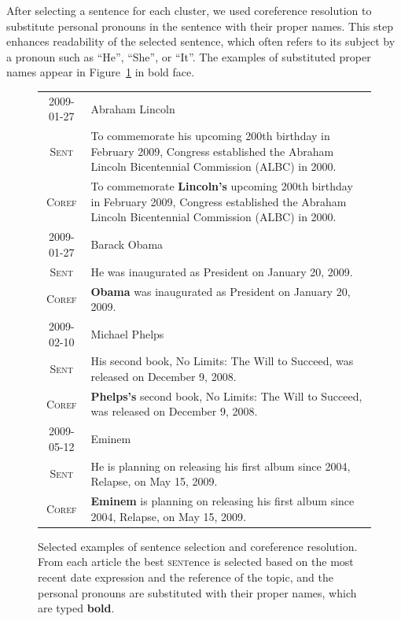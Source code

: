 \documentclass[11pt]{article}
\newcommand{\war}[1]{{\sf\small #1}}
\begin{document}
After selecting a sentence for each cluster, we used coreference resolution to substitute personal pronouns in the sentence with their proper names.
This step enhances readability of the selected sentence, which often refers to its subject by a pronoun such as ``He'', ``She'', or ``It''.
The examples of substituted proper names appear in Figure~\ref{fig:sentence-selection} in bold face.

\begin{figure}
\begin{tabularx}{\linewidth}{cX}
2009-01-27 & \war{Abraham Lincoln} \\
\textsc{Sent} & \small To commemorate his upcoming 200th birthday in February 2009, Congress established the Abraham Lincoln Bicentennial Commission (ALBC) in 2000. \\
\textsc{Coref} & \small To commemorate \textbf{Lincoln's} upcoming 200th birthday in February 2009, Congress established the Abraham Lincoln Bicentennial Commission (ALBC) in 2000. \\
\hline
2009-01-27 & \war{Barack Obama} \\
\textsc{Sent} & \small He was inaugurated as President on January 20, 2009.\\
\textsc{Coref} & \small \textbf{Obama} was inaugurated as President on January 20, 2009.\\
\hline
2009-02-10 & \war{Michael Phelps} \\
\textsc{Sent} & \small His second book, No Limits: The Will to Succeed, was released on December 9, 2008.\\
\textsc{Coref} & \small \textbf{Phelps's} second book, No Limits: The Will to Succeed, was released on December 9, 2008.\\
\hline
2009-05-12 & \war{Eminem}\\
\textsc{Sent} & \small He is planning on releasing his first album since 2004, Relapse, on May 15, 2009.\\
\textsc{Coref} & \small \textbf{Eminem} is planning on releasing his first album since 2004, Relapse, on May 15, 2009.\\
\end{tabularx}
\label{fig:sentence-selection}
\caption{Selected examples of sentence selection and coreference resolution.
From each \war{article} the best \textsc{sent}ence is selected
based on the most recent date expression and the reference of the topic,
and the personal pronouns are substituted with their proper names,
which are typed \textbf{bold}.}
\end{figure}
\end{document}
